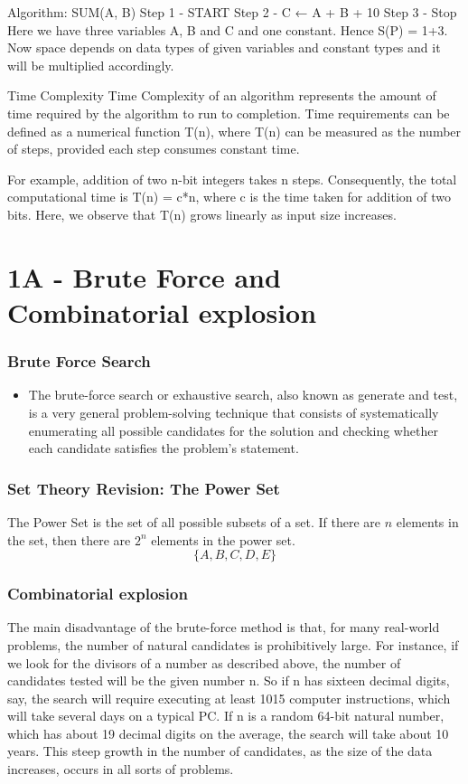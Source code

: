 \begin{frame}
Algorithm: SUM(A, B)
Step 1 -  START
Step 2 -  C ← A + B + 10
Step 3 -  Stop
Here we have three variables A, B and C and one constant. Hence S(P) = 1+3. Now space depends on data types of given variables and constant types and it will be multiplied accordingly.
\end{frame}
\begin{frame}
Time Complexity
Time Complexity of an algorithm represents the amount of time required by the algorithm to run to completion. Time requirements can be defined as a numerical function T(n), where T(n) can be measured as the number of steps, provided each step consumes constant time.

For example, addition of two n-bit integers takes n steps. Consequently, the total computational time is T(n) = c*n, where c is the time taken for addition of two bits. Here, we observe that T(n) grows linearly as input size increases.
\end{frame}
\section{1A - Brute Force and Combinatorial explosion}
\begin{frame}
\frametitle{Brute Force Search}
\begin{itemize}
\item The brute-force search or exhaustive search, also known as generate and test, is a very general problem-solving technique that consists of systematically enumerating all possible candidates for the solution and checking whether each candidate satisfies the problem's statement.
\end{itemize}
\end{frame}


\begin{frame}
\frametitle{Set Theory Revision: The Power Set}
The Power Set is the set of all possible subsets of a set. If there are $n$ elements in the set, then there are $2^n$ elements in the power set.
\[ \{A,B,C,D,E\}\]
\end{frame}


\begin{frame}
\frametitle{Combinatorial explosion}
The main disadvantage of the brute-force method is that, for many real-world problems, the number of natural candidates is prohibitively large. For instance, if we look for the divisors of a number as described above, the number of candidates tested will be the given number n. So if n has sixteen decimal digits, say, the search will require executing at least 1015 computer instructions, which will take several days on a typical PC. If n is a random 64-bit natural number, which has about 19 decimal digits on the average, the search will take about 10 years. This steep growth in the number of candidates, as the size of the data increases, occurs in all sorts of problems. 
\end{frame}


